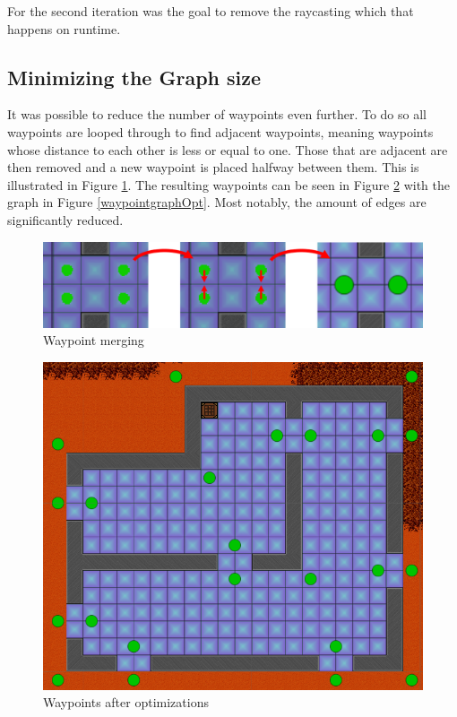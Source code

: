 For the second iteration was the goal to remove the raycasting which that happens on runtime.

\subsection*{Minimizing the Graph size}
It was possible to reduce the number of waypoints even further.
To do so all waypoints are looped through to find adjacent waypoints, meaning waypoints whose distance to each other is less or equal to one.
Those that are adjacent are then removed and a new waypoint is placed halfway between them.
This is illustrated in Figure \ref{waypointMerge}.
The resulting waypoints can be seen in Figure \ref{waypointOpt} with the graph in Figure \ref{waypointgraphOpt}.
Most notably, the amount of edges are significantly reduced.
\begin{figure}[H]
	\includegraphics[width=\textwidth]{figures/astar/waypointMerge}
	\caption{Waypoint merging}
	\label{waypointMerge}
\end{figure}

\begin{figure}[H]
	\includegraphics[width=\textwidth]{figures/astar/optimizedWaypoints}
	\caption{Waypoints after optimizations}
	\label{waypointOpt}
\end{figure}

